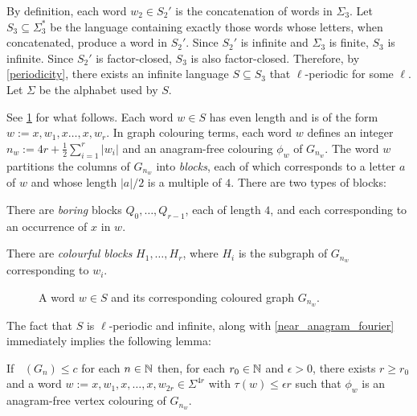 \documentclass{patmorin}
\DeclareMathOperator{\afcn}{\dot{\chi}_\pi}
\begin{document}
By definition, each word $w_2\in S_2'$ is the concatenation of words in $\Sigma_3$. Let $S_3\subseteq \Sigma_3^*$ be the language containing exactly those words whose letters, when concatenated, produce a word in $S_2'$.  Since $S_2'$ is infinite and $\Sigma_3$ is finite, $S_3$ is infinite.  Since $S_2'$ is factor-closed, $S_3$ is also factor-closed.  Therefore, by \cref{periodicity}, there exists an infinite language $S\subseteq S_3$ that $\ell$-periodic for some $\ell$.  Let $\Sigma$ be the alphabet used by $S$.

See \cref{bigexample} for what follows. Each word $w\in S$ has even length and is of the form $w:=x,w_1,x\ldots,x,w_{r}$.  In graph colouring terms, each word $w$ defines an integer $n_w:=4r+\tfrac{1}{2}\sum_{i=1}^r|w_i|$ and an anagram-free colouring $\phi_w$ of $G_{n_w}$. The word $w$ partitions the columns of $G_{n_w}$ into \emph{blocks}, each of which corresponds to a letter $a$ of $w$ and whose length $|a|/2$ is a multiple of $4$.  There are two types of blocks:
\begin{compactitem}
    \item There are \emph{boring} blocks $Q_0,\ldots,Q_{r-1}$, each of length $4$, and each corresponding to an occurrence of $x$ in $w$.
    \item There are \emph{colourful blocks} $H_1,\ldots,H_r$, where $H_i$ is the subgraph of $G_{n_w}$ corresponding to $w_i$.
\end{compactitem}


\begin{figure}
    \caption{A word $w\in S$ and its corresponding coloured graph $G_{n_w}$.}
    \label{bigexample}
\end{figure}

The fact that $S$ is $\ell$-periodic and infinite, along with \cref{near_anagram_fourier} immediately implies the following lemma:

\begin{lem}\label{near_anagram_graph}
    If $\afcn(G_n)\le c$ for each $n\in\mathbb{N}$ then, for each $r_0\in\mathbb{N}$ and $\epsilon>0$, there exists $r\ge r_0$ and a word $w:=x,w_1,x,\ldots,x,w_{2r}\in\Sigma^{4r}$ with $\tau(w)\le\epsilon r$ such that $\phi_w$ is an anagram-free vertex colouring of $G_{n_w}$.
\end{lem}

\end{document}

